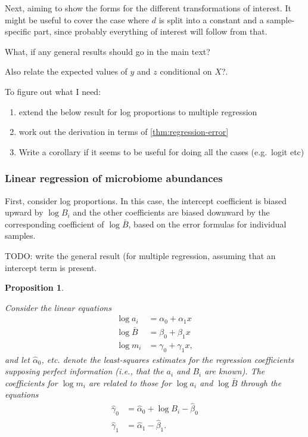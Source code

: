 \documentclass[
]{article}
\providecommand{\tightlist}{%
  \setlength{\itemsep}{0pt}\setlength{\parskip}{0pt}}
\newtheorem{proposition}{Proposition}[section]
\theoremstyle{definition}
\theoremstyle{definition}
\theoremstyle{definition}
\theoremstyle{definition}
\theoremstyle{remark}
\begin{document}
Next, aiming to show the forms for the different transformations of interest.
It might be useful to cover the case where \(d\) is split into a constant and a sample-specific part, since probably everything of interest will follow from that.

What, if any general results should go in the main text?

Also relate the expected values of \(y\) and \(z\) conditional on \(X\)?.

To figure out what I need:

\begin{enumerate}
\def\labelenumi{\arabic{enumi}.}
\tightlist
\item
  extend the below result for log proportions to multiple regression
\item
  work out the derivation in terms of \ref{thm:regression-error}
\item
  Write a corollary if it seems to be useful for doing all the cases (e.g.~logit etc)
\end{enumerate}

\hypertarget{linear-regression-of-microbiome-abundances}{%
\subsubsection{Linear regression of microbiome abundances}\label{linear-regression-of-microbiome-abundances}}

First, consider log proportions.
In this case, the intercept coefficient is biased upward by \(\log B_i\) and the other coefficients are biased downward by the corresponding coefficient of \(\log \bar B\), based on the error formulas for individual samples.

TODO: write the general result (for multiple regression, assuming that an intercept term is present.

\begin{proposition}
\protect\hypertarget{prp:unlabeled-div-3}{}\label{prp:unlabeled-div-3}

Consider the linear equations
\begin{align}
  \label{eq:least-squares-formulation}
  \log a_i    &= \alpha_0 + \alpha_1 x \\
  \log \bar B &= \beta_0 + \beta_1 x   \\
  \log m_i    &= \gamma_0 + \gamma_1 x,
\end{align}
and let \(\hat \alpha_0\), etc. denote the least-squares estimates for the regression coefficients supposing perfect information (i.e., that the \(a_i\) and \(B_i\) are known).
The coefficients for \(\log m_i\) are related to those for \(\log a_i\) and \(\log \bar B\) through the equations
\begin{align}
  \label{eq:least-squares-estimates}
  \hat \gamma_0 &= \hat \alpha_0 + \log B_i - \hat \beta_0 \\
  \hat \gamma_1 &= \hat \alpha_1 - \hat \beta_1.
\end{align}

\end{proposition}
\end{document}
